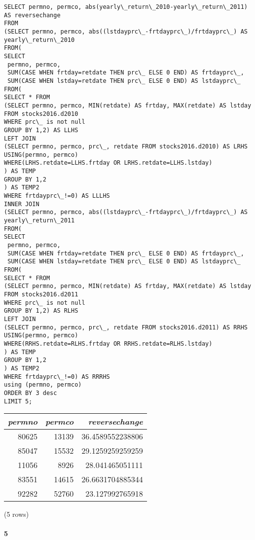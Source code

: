 \documentclass[]{article}
\let\oldparagraph\paragraph
\renewcommand{\paragraph}[1]{\oldparagraph{#1}\mbox{}}
\begin{document}
\color{blue}
\begin{verbatim}
SELECT permno, permco, abs(yearly\_return\_2010-yearly\_return\_2011) AS reversechange
FROM
(SELECT permno, permco, abs((lstdayprc\_-frtdayprc\_)/frtdayprc\_) AS yearly\_return\_2010
FROM(
SELECT
 permno, permco,
 SUM(CASE WHEN frtday=retdate THEN prc\_ ELSE 0 END) AS frtdayprc\_,
 SUM(CASE WHEN lstday=retdate THEN prc\_ ELSE 0 END) AS lstdayprc\_
FROM(
SELECT * FROM
(SELECT permno, permco, MIN(retdate) AS frtday, MAX(retdate) AS lstday FROM stocks2016.d2010
WHERE prc\_ is not null
GROUP BY 1,2) AS LLHS
LEFT JOIN
(SELECT permno, permco, prc\_, retdate FROM stocks2016.d2010) AS LRHS
USING(permno, permco)
WHERE(LRHS.retdate=LLHS.frtday OR LRHS.retdate=LLHS.lstday)
) AS TEMP
GROUP BY 1,2
) AS TEMP2
WHERE frtdayprc\_!=0) AS LLLHS
INNER JOIN
(SELECT permno, permco, abs((lstdayprc\_-frtdayprc\_)/frtdayprc\_) AS yearly\_return\_2011
FROM(
SELECT
 permno, permco,
 SUM(CASE WHEN frtday=retdate THEN prc\_ ELSE 0 END) AS frtdayprc\_,
 SUM(CASE WHEN lstday=retdate THEN prc\_ ELSE 0 END) AS lstdayprc\_
FROM(
SELECT * FROM
(SELECT permno, permco, MIN(retdate) AS frtday, MAX(retdate) AS lstday FROM stocks2016.d2011
WHERE prc\_ is not null
GROUP BY 1,2) AS RLHS
LEFT JOIN
(SELECT permno, permco, prc\_, retdate FROM stocks2016.d2011) AS RRHS
USING(permno, permco)
WHERE(RRHS.retdate=RLHS.frtday OR RRHS.retdate=RLHS.lstday)
) AS TEMP
GROUP BY 1,2
) AS TEMP2
WHERE frtdayprc\_!=0) AS RRRHS
using (permno, permco)
ORDER BY 3 desc
LIMIT 5;
\end{verbatim}
\color{black}

\begin{center}
\begin{tabular}{r | r | r}
\textit{permno} & \textit{permco} & \textit{reversechange} \\
\hline
80625 & 13139 & 36.4589552238806 \\
85047 & 15532 & 29.1259259259259 \\
11056 & 8926 & 28.041465051111 \\
83551 & 14615 & 26.6631704885344 \\
92282 & 52760 & 23.127992765918 \\
\end{tabular}

\noindent (5 rows) \\
\end{center}

\paragraph{5}
\end{document}
